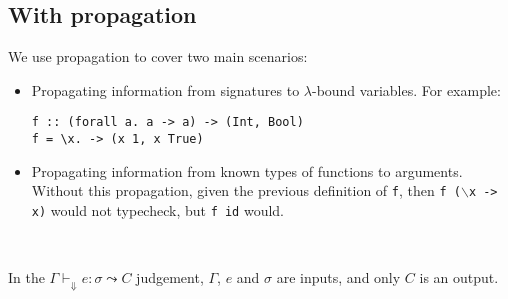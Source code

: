 \documentclass[12pt]{article}
\begin{document}
\subsection{With propagation}

\noindent We use propagation to cover two main scenarios:
\begin{itemize}
\item Propagating information from signatures to $\lambda$-bound variables. For example:
\begin{verbatim}
f :: (forall a. a -> a) -> (Int, Bool)
f = \x. -> (x 1, x True)
\end{verbatim}
\item Propagating information from known types of functions to arguments. Without this propagation, given the previous definition of {\tt f}, then {\tt f ($\backslash$x -> x)} would not typecheck, but {\tt f id} would.
\end{itemize}

\

\noindent In the $\Gamma \vdash_\Downarrow e : \sigma \leadsto C$ judgement, $\Gamma$, $e$ and $\sigma$ are inputs, and only $C$ is an output.

\begin{prooftree}
\end{prooftree}

\begin{prooftree}
\end{prooftree}

\begin{prooftree}
\end{prooftree}

\begin{prooftree}
\end{prooftree}
\end{document}
